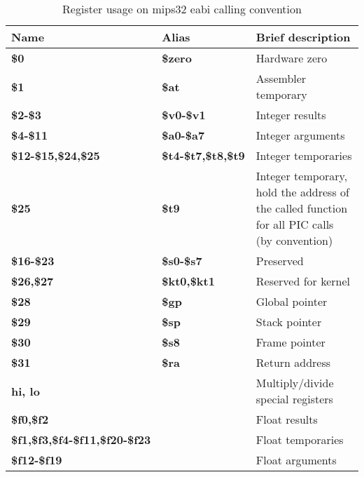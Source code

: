 \begin{table}[h]
\begin{tabular*}{0.95\textwidth}{lll}
\hline
Name                                   & Alias                     & Brief description\\
\hline                                                             
{\bf \$0}                              & {\bf \$zero}              & Hardware zero \\
{\bf \$1}                              & {\bf \$at}                & Assembler temporary \\
{\bf \$2-\$3}                          & {\bf \$v0-\$v1}           & Integer results \\
{\bf \$4-\$11}                         & {\bf \$a0-\$a7}           & Integer arguments\\
{\bf \$12-\$15,\$24,\$25}              & {\bf \$t4-\$t7,\$t8,\$t9} & Integer temporaries \\
{\bf \$25}                             & {\bf \$t9}                & Integer temporary, hold the address of the called function for all PIC calls (by convention) \\
{\bf \$16-\$23}                        & {\bf \$s0-\$s7}           & Preserved \\
{\bf \$26,\$27}                        & {\bf \$kt0,\$kt1}         & Reserved for kernel \\
{\bf \$28}                             & {\bf \$gp}                & Global pointer \\
{\bf \$29}                             & {\bf \$sp}                & Stack pointer \\
{\bf \$30}                             & {\bf \$s8}                & Frame pointer \\
{\bf \$31}                             & {\bf \$ra}                & Return address \\
{\bf hi, lo}                           &                           & Multiply/divide special registers \\
{\bf \$f0,\$f2}                        &                           & Float results \\
{\bf \$f1,\$f3,\$f4-\$f11,\$f20-\$f23} &                           & Float temporaries \\
{\bf \$f12-\$f19}                      &                           & Float arguments \\
\end{tabular*}
\caption{Register usage on mips32 eabi calling convention}
\end{table}

